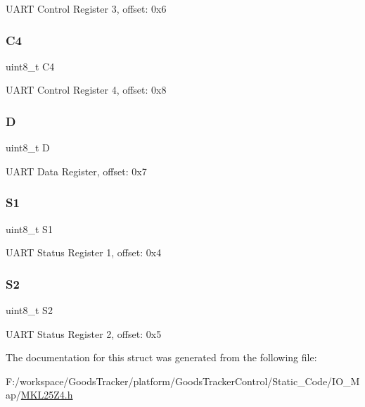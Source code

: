 U\+A\+RT Control Register 3, offset\+: 0x6 \mbox{\label{struct_u_a_r_t___mem_map_a9ecb3242c606bc219190b4cb4f64600f}} 
\subsubsection{\texorpdfstring{C4}{C4}}
{\footnotesize\ttfamily uint8\+\_\+t C4}

U\+A\+RT Control Register 4, offset\+: 0x8 \mbox{\label{struct_u_a_r_t___mem_map_a42ede28e876dcdb2ce2ddd730de0401e}} 
\subsubsection{\texorpdfstring{D}{D}}
{\footnotesize\ttfamily uint8\+\_\+t D}

U\+A\+RT Data Register, offset\+: 0x7 \mbox{\label{struct_u_a_r_t___mem_map_a61370495fe05fc15ca074ec7a5c2d99f}} 
\subsubsection{\texorpdfstring{S1}{S1}}
{\footnotesize\ttfamily uint8\+\_\+t S1}

U\+A\+RT Status Register 1, offset\+: 0x4 \mbox{\label{struct_u_a_r_t___mem_map_a7ff71460633a0ef4ba8d6a700d49b993}} 
\subsubsection{\texorpdfstring{S2}{S2}}
{\footnotesize\ttfamily uint8\+\_\+t S2}

U\+A\+RT Status Register 2, offset\+: 0x5 

The documentation for this struct was generated from the following file\+:\begin{DoxyCompactItemize}
\item 
F\+:/workspace/\+Goods\+Tracker/platform/\+Goods\+Tracker\+Control/\+Static\+\_\+\+Code/\+I\+O\+\_\+\+Map/\hyperlink{_m_k_l25_z4_8h}{M\+K\+L25\+Z4.\+h}\end{DoxyCompactItemize}
